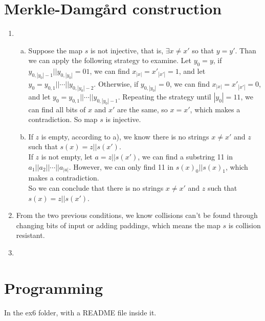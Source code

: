 \documentclass{article}
\begin{document}
\section{Merkle-Damgård construction}
\begin{enumerate}
\item
\begin{enumerate}[a)]
\item
Suppose the map $s$ is not injective, that is, $\exists x\neq x'$ so that $y=y'$. Than we can apply the following strategy to examine. Let $y_0=y$, if $y_{0,|y_0|-1}||y_{0,|y_0|}=01$, we can find $x_{|x|}=x'_{|x'|}=1$, and let $y_0=y_{0,1}||\cdots||y_{0,|y_0|-2}$. Otherwise, if $y_{0,|y_0|}=0$, we can find $x_{|x|}=x'_{|x'|}=0$, and let $y_0=y_{0,1}||\cdots||y_{0,|y_0|-1}$. Repeating the strategy until $|y_0|=11$, we can find all bits of $x$ and $x'$ are the same, so $x=x'$, which makes a contradiction. So map $s$ is injective.
\item
If $z$ is empty, according to a), we know there is no strings $x\neq x'$ and $z$ such that $s(x) = z||s(x')$.\\
If $z$ is not empty, let $a=z||s(x')$, we can find a substring 11 in $a_1||a_2||\cdots||a_{|a|}$. However, we can only find 11 in $s(x)_0||s(x)_1$, which makes a contradiction.\\
So we can conclude that there is no strings $x\neq x'$ and $z$ such that $s(x) = z||s(x')$.
\end{enumerate}
\item
From the two previous conditions, we know collisions can't be found through changing bits of input or adding paddings, which means the map $s$ is collision resistant.
\item

\end{enumerate}

\section{Programming}
In the ex6 folder, with a README file inside it.
\end{document}

